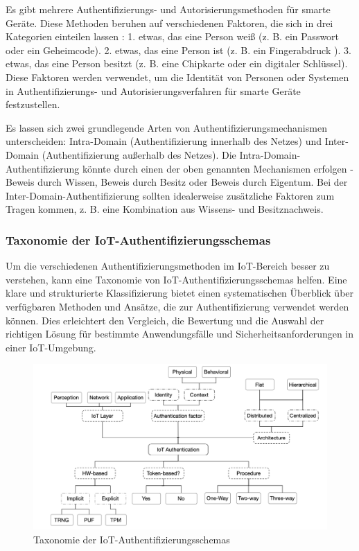 Es gibt mehrere Authentifizierungs- und Autorisierungsmethoden für smarte Geräte. Diese Methoden beruhen auf verschiedenen Faktoren, die sich in drei Kategorien einteilen lassen \cite{khatoun2022cybersecurity}: 1. etwas, das eine Person weiß (z. B. ein Passwort oder ein Geheimcode). 
2. etwas, das eine Person ist (z. B. ein Fingerabdruck ). 
3. etwas, das eine Person besitzt (z. B. eine Chipkarte oder ein digitaler Schlüssel).
Diese Faktoren werden verwendet, um die Identität von Personen oder Systemen in Authentifizierungs- und Autorisierungsverfahren für smarte Geräte festzustellen.


Es lassen sich zwei grundlegende Arten von Authentifizierungsmechanismen unterscheiden: Intra-Domain (Authentifizierung innerhalb des Netzes) und Inter-Domain (Authentifizierung außerhalb des Netzes). Die Intra-Domain-Authentifizierung könnte durch einen der oben genannten Mechanismen erfolgen - Beweis durch Wissen, Beweis durch Besitz oder Beweis durch Eigentum. Bei der Inter-Domain-Authentifizierung sollten idealerweise zusätzliche Faktoren zum Tragen kommen, z. B. eine Kombination aus Wissens- und Besitznachweis.\cite{khatoun2022cybersecurity}


\subsubsection{Taxonomie der IoT-Authentifizierungsschemas}

Um die verschiedenen Authentifizierungsmethoden im IoT-Bereich besser zu verstehen, kann eine Taxonomie von IoT-Authentifizierungsschemas helfen.  Eine klare und strukturierte Klassifizierung bietet einen systematischen Überblick über verfügbaren Methoden und Ansätze, die zur Authentifizierung verwendet werden können. Dies erleichtert den Vergleich, die Bewertung und die Auswahl der richtigen Lösung für bestimmte Anwendungsfälle und Sicherheitsanforderungen in einer IoT-Umgebung. 
\begin{figure}[h]
  \centering
 \includegraphics[scale=0.35]{resources/IoT_Auh_schems.png}
 \caption{Taxonomie der IoT-Authentifizierungsschemas \cite{el2019survey}}
  \label{fig:taxonomie}
\end{figure}\

